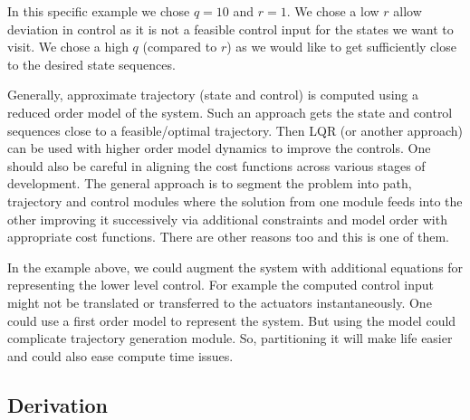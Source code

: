 In this specific example we chose $q=10$ and $r=1$. We chose a low $r$ allow deviation in control as it is not a feasible control input for the states we want to visit. We chose a high $q$ (compared to $r$) as we would like to get sufficiently close to the desired state sequences.



Generally, approximate trajectory (state and control) is computed using a reduced order model of the system. Such an approach gets the state and control sequences close to a feasible/optimal trajectory. Then LQR (or another approach) can be used with higher order model dynamics to improve the controls. One should also be careful in aligning the cost functions across various stages of development. The general approach is to segment the problem into path, trajectory and control modules where the solution from one module feeds into the other improving it successively via additional constraints and model order with appropriate cost functions. There are other reasons too and this is one of them. 

In the example above, we could augment the system with additional equations for representing the lower level control. For example the computed control input might not be translated or transferred to the actuators instantaneously. One could use a first order model to represent the system. But using the model could complicate trajectory generation module. So, partitioning it will make life easier and could also ease compute time issues.

\subsection{Derivation}
